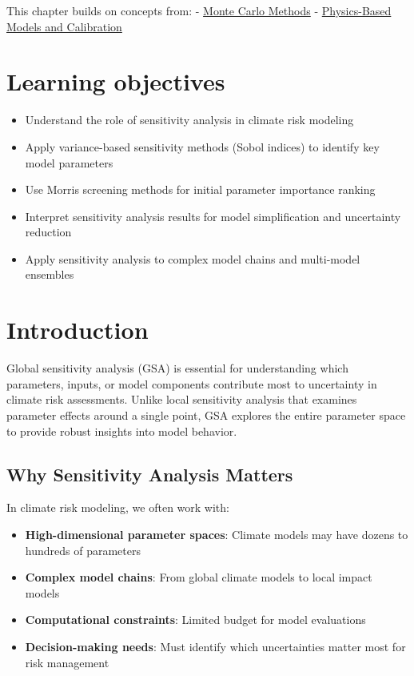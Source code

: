 \documentclass[
  letterpaper,
  DIV=11,
  numbers=noendperiod]{scrreprt}
\providecommand{\tightlist}{%
  \setlength{\itemsep}{0pt}\setlength{\parskip}{0pt}}
\begin{document}

This chapter builds on concepts from: -
\href{./chapters/fundamentals/monte-carlo.qmd}{Monte Carlo Methods} -
\href{./chapters/hazard/physics-models.qmd}{Physics-Based Models and
Calibration}

\section*{Learning objectives}\label{learning-objectives-12}


\begin{itemize}
\tightlist
\item
  Understand the role of sensitivity analysis in climate risk modeling
\item
  Apply variance-based sensitivity methods (Sobol indices) to identify
  key model parameters
\item
  Use Morris screening methods for initial parameter importance ranking
\item
  Interpret sensitivity analysis results for model simplification and
  uncertainty reduction
\item
  Apply sensitivity analysis to complex model chains and multi-model
  ensembles
\end{itemize}

\section{Introduction}\label{introduction}

Global sensitivity analysis (GSA) is essential for understanding which
parameters, inputs, or model components contribute most to uncertainty
in climate risk assessments. Unlike local sensitivity analysis that
examines parameter effects around a single point, GSA explores the
entire parameter space to provide robust insights into model behavior.

\subsection{Why Sensitivity Analysis
Matters}\label{why-sensitivity-analysis-matters}

In climate risk modeling, we often work with:

\begin{itemize}
\tightlist
\item
  \textbf{High-dimensional parameter spaces}: Climate models may have
  dozens to hundreds of parameters
\item
  \textbf{Complex model chains}: From global climate models to local
  impact models
\item
  \textbf{Computational constraints}: Limited budget for model
  evaluations
\item
  \textbf{Decision-making needs}: Must identify which uncertainties
  matter most for risk management
\end{itemize}
\end{document}
